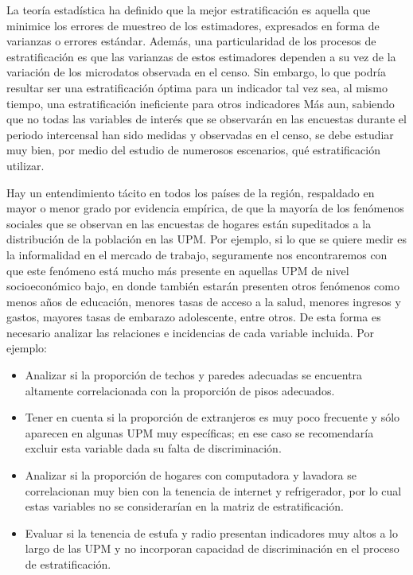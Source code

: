 \documentclass[
  12pt,
]{book}
\providecommand{\tightlist}{%
  \setlength{\itemsep}{0pt}\setlength{\parskip}{0pt}}
\begin{document}
La teoría estadística ha definido que la mejor estratificación es aquella que minimice los errores de muestreo de los estimadores, expresados en forma de varianzas o errores estándar. Además, una particularidad de los procesos de estratificación es que las varianzas de estos estimadores dependen a su vez de la variación de los microdatos observada en el censo. Sin embargo, lo que podría resultar ser una estratificación óptima para un indicador tal vez sea, al mismo tiempo, una estratificación ineficiente para otros indicadores Más aun, sabiendo que no todas las variables de interés que se observarán en las encuestas durante el periodo intercensal han sido medidas y observadas en el censo, se debe estudiar muy bien, por medio del estudio de numerosos escenarios, qué estratificación utilizar.

Hay un entendimiento tácito en todos los países de la región, respaldado en mayor o menor grado por evidencia empírica, de que la mayoría de los fenómenos sociales que se observan en las encuestas de hogares están supeditados a la distribución de la población en las UPM. Por ejemplo, si lo que se quiere medir es la informalidad en el mercado de trabajo, seguramente nos encontraremos con que este fenómeno está mucho más presente en aquellas UPM de nivel socioeconómico bajo, en donde también estarán presenten otros fenómenos como menos años de educación, menores tasas de acceso a la salud, menores ingresos y gastos, mayores tasas de embarazo adolescente, entre otros. De esta forma es necesario analizar las relaciones e incidencias de cada variable incluida. Por ejemplo:

\begin{itemize}
\tightlist
\item
  Analizar si la proporción de techos y paredes adecuadas se encuentra altamente correlacionada con la proporción de pisos adecuados.
\item
  Tener en cuenta si la proporción de extranjeros es muy poco frecuente y sólo aparecen en algunas UPM muy específicas; en ese caso se recomendaría excluir esta variable dada su falta de discriminación.
\item
  Analizar si la proporción de hogares con computadora y lavadora se correlacionan muy bien con la tenencia de internet y refrigerador, por lo cual estas variables no se considerarían en la matriz de estratificación.
\item
  Evaluar si la tenencia de estufa y radio presentan indicadores muy altos a lo largo de las UPM y no incorporan capacidad de discriminación en el proceso de estratificación.
\end{itemize}
\end{document}
